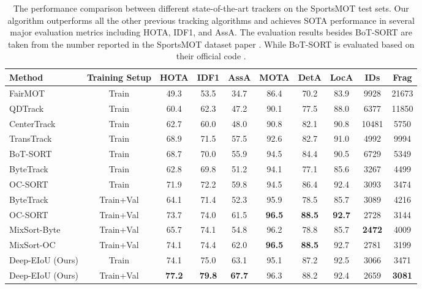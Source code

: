\documentclass[10pt,twocolumn,letterpaper]{article}
\begin{document}
\begin{table*}[t]
  \begin{center}
    {\small{
\begin{tabular}{lccccccccc}
\toprule

 Method & Training Setup & HOTA & IDF1 & AssA & MOTA & DetA & LocA & IDs & Frag \\
 
\midrule

FairMOT \cite{FairMOT} & Train & 49.3 & 53.5 & 34.7 & 86.4 & 70.2 & 83.9 & 9928 & 21673 \\
QDTrack \cite{fischer2022qdtrack} & Train & 60.4 & 62.3 & 47.2 & 90.1 & 77.5 & 88.0 & 6377 & 11850 \\
CenterTrack \cite{Zhou2020TrackingOA} & Train & 62.7 & 60.0 & 48.0 & 90.8 & 82.1 & 90.8 & 10481 & 5750 \\
TransTrack \cite{sun2020transtrack} & Train & 68.9 & 71.5 & 57.5 & 92.6 & 82.7 & 91.0 & 4992 & 9994 \\
BoT-SORT \cite{aharon2022bot} & Train & 68.7 & 70.0 & 55.9 & 94.5 & 84.4 & 90.5 & 6729 & 5349 \\
ByteTrack \cite{ByteTrack} & Train & 62.8 & 69.8 & 51.2 & 94.1 & 77.1 & 85.6 & 3267 & 4499 \\
OC-SORT \cite{OCSORT} & Train & 71.9 & 72.2 & 59.8 & 94.5 & 86.4 & 92.4 & 3093 & 3474 \\
ByteTrack \cite{ByteTrack} & Train+Val & 64.1 & 71.4 & 52.3 & 95.9 & 78.5 & 85.7 & 3089 & 4216 \\
OC-SORT \cite{OCSORT} & Train+Val & 73.7 & 74.0 & 61.5 & \textbf{96.5} & \textbf{88.5} & \textbf{92.7} & 2728 & 3144\\
MixSort-Byte \cite{cui2023sportsmot} & Train+Val & 65.7 & 74.1 & 54.8 & 96.2 & 78.8 & 85.7 & \textbf{2472} & 4009 \\
MixSort-OC \cite{cui2023sportsmot} & Train+Val & 74.1 & 74.4 & 62.0 & \textbf{96.5} & \textbf{88.5} & 92.7 & 2781 & 3199\\
\midrule
\rowcolor{aliceblue}
Deep-EIoU (Ours) & Train & 74.1 & 75.0 & 63.1 & 95.1 & 87.2 & 92.5 & 3066 & 3471 \\
\rowcolor{aliceblue}
Deep-EIoU (Ours) & Train+Val & \textbf{77.2} & \textbf{79.8} & \textbf{67.7} & 96.3 & 88.2 & 92.4 & 2659 & \textbf{3081} \\

\bottomrule
\end{tabular}
}}
\end{center}
\caption{The performance comparison between different state-of-the-art trackers on the SportsMOT test sets. Our algorithm outperforms all the other previous tracking algorithms and achieves SOTA performance in several major evaluation metrics including HOTA, IDF1, and AssA. The evaluation results besides BoT-SORT are taken from the number reported in the SportsMOT dataset paper \cite{cui2023sportsmot}. While BoT-SORT is evaluated based on their official code \cite{aharon2022bot}.
} 
\label{table:sportsmot}
\end{table*}
\end{document}
